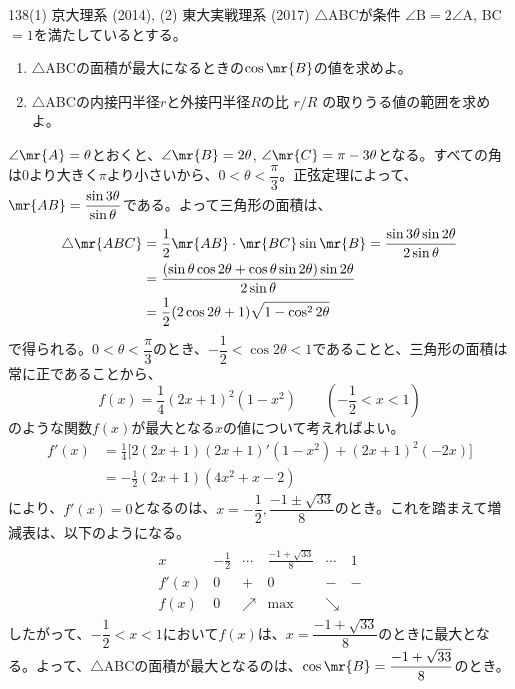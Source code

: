 \begin{prob}{138}{}{(1) 京大理系 (2014), (2) 東大実戦理系 (2017)}
 $\triangle$ABCが条件 $\angle{\mbox{B}}=2\angle{\mbox{A}}$, BC$=1$を満たしているとする。
 \begin{enumerate}
  \item $\triangle$ABCの面積が最大になるときの$\cos\mr{B}$の値を求めよ。
  \item $\triangle$ABCの内接円半径$r$と外接円半径$R$の比 $r/R$ の取りうる値の範囲を求めよ。
 \end{enumerate}
\end{prob}
$\angle\mr{A}=\theta$とおくと、$\angle\mr{B}=2\theta$, $\angle\mr{C}=\pi-3\theta$となる。すべての角は0より大きく$\pi$より小さいから、$0<\theta<\dfrac{\pi}{3}$。正弦定理によって、$\mr{AB}=\dfrac{\sin3\theta}{\sin\theta}$である。よって三角形の面積は、
\begin{align*}
 \triangle\mr{ABC}&=\frac{1}{2}\mr{AB}\cdot\mr{BC}\sin\mr{B}=\frac{\sin3\theta\sin2\theta}{2\sin\theta} \\
 &=\frac{(\sin\theta\cos2\theta+\cos\theta\sin2\theta)\sin2\theta}{2\sin\theta} \\
 &=\frac{1}{2}(2\cos2\theta+1)\sqrt{1-\cos^22\theta}
\end{align*}
で得られる。$0<\theta<\dfrac{\pi}{3}$のとき、$-\dfrac{1}{2}<\cos2\theta<1$であることと、三角形の面積は常に正であることから、
\[ f(x)=\frac{1}{4}(2x+1)^2(1-x^2) \qquad \left(-\frac{1}{2}<x<1\right) \]
のような関数$f(x)$が最大となる$x$の値について考えればよい。
\begin{align*}
 f'(x)&=\frac{1}{4}\bigl[2(2x+1)(2x+1)'(1-x^2)+(2x+1)^2(-2x)\bigr] \\
 &=-\frac{1}{2}(2x+1)(4x^2+x-2)
\end{align*}
により、$f'(x)=0$となるのは、$x=-\dfrac{1}{2}, \dfrac{-1\pm\sqrt{33}}{8}$のとき。これを踏まえて増減表は、以下のようになる。
\begin{align*}
 \begin{array}{c|c|c|c|c|c}
  x & -\frac{1}{2} & \cdots & \frac{-1+\sqrt{33}}{8}& \cdots & 1 \\ \hline
  f'(x) & 0 & + & 0 & - & - \\ \hline
  f(x) & 0 & \nearrow & \text{max} & \searrow & 
 \end{array}
\end{align*}
したがって、$-\dfrac{1}{2}<x<1$において$f(x)$は、$x=\dfrac{-1+\sqrt{33}}{8}$のときに最大となる。よって、$\triangle$ABCの面積が最大となるのは、$\cos\mr{B}=\dfrac{-1+\sqrt{33}}{8}$のとき。

